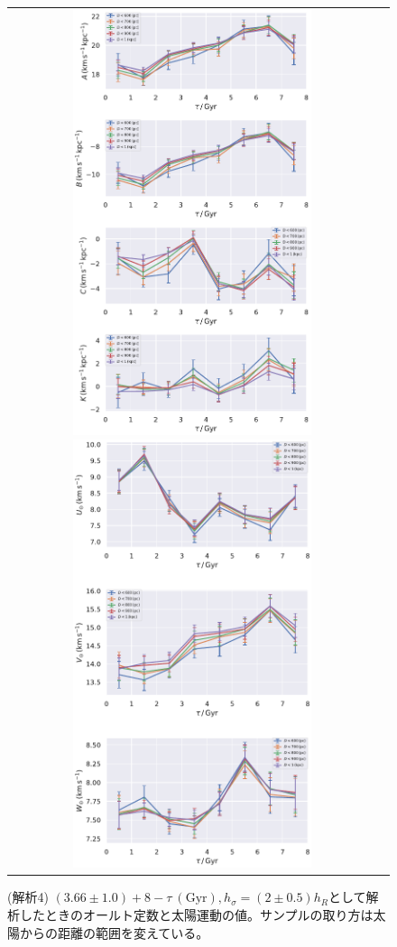 
\begin{figure}[htbp]
   \centering
\begin{tabular}{cc}
\includegraphics[width=7cm]{fig/ABCK_4.pdf}
\includegraphics[width=7cm]{fig/UVW_4.pdf}
\end{tabular}
    \caption{(解析4) $(3.66 \pm 1.0) + 8 - \tau\ (\mathrm{Gyr}), h_{\sigma} = (2\pm 0.5)h_R$として解析したときのオールト定数と太陽運動の値。サンプルの取り方は太陽からの距離の範囲を変えている。}
    \label{figObs4}
\end{figure}

